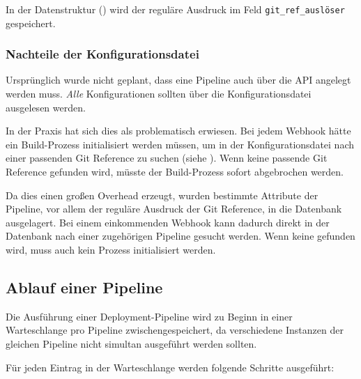 In der Datenstruktur () wird der reguläre Ausdruck im Feld \texttt{git\_\allowbreak ref\_\allowbreak auslöser} gespeichert.

\subsubsection{Nachteile der Konfigurationsdatei}

Ursprünglich wurde nicht geplant, dass eine Pipeline auch über die API angelegt werden muss. \emph{Alle} Konfigurationen sollten über die Konfigurationsdatei ausgelesen werden.

In der Praxis hat sich dies als problematisch erwiesen. Bei jedem Webhook hätte ein Build-Prozess initialisiert werden müssen, um in der Konfigurationsdatei nach einer passenden Git Reference zu suchen (siehe ). Wenn keine passende Git Reference gefunden wird, müsste der Build-Prozess sofort abgebrochen werden.

Da dies einen großen Overhead erzeugt, wurden bestimmte Attribute der Pipeline, vor allem der reguläre Ausdruck der Git Reference, in die Datenbank ausgelagert. Bei einem einkommenden Webhook kann dadurch direkt in der Datenbank nach einer zugehörigen Pipeline gesucht werden. Wenn keine gefunden wird, muss auch kein Prozess initialisiert werden.

\subsection{Ablauf einer Pipeline}
\label{subsec:ablauf-build}

Die Ausführung einer Deployment-Pipeline wird zu Beginn in einer Warteschlange pro Pipeline zwischengespeichert, da verschiedene Instanzen der gleichen Pipeline nicht simultan ausgeführt werden sollten.

Für jeden Eintrag in der Warteschlange werden folgende Schritte ausgeführt:

